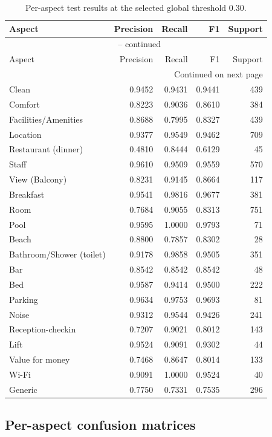 \documentclass[11pt,a4paper]{report}
\begin{document}
\begin{longtable}{p{4.3cm}rrrr}
\caption{Per-aspect test results at the selected global threshold 0.30.}\label{tab:aspect-results}\\
\toprule
Aspect & Precision & Recall & F1 & Support \\
\midrule
\endfirsthead
\multicolumn{5}{c}{\tablename\ \thetable{} -- continued}\\
\toprule
Aspect & Precision & Recall & F1 & Support \\
\midrule
\endhead
\midrule
\multicolumn{5}{r}{Continued on next page}\\
\endfoot
\bottomrule
\endlastfoot
Clean & 0.9452 & 0.9431 & 0.9441 & 439 \\
Comfort & 0.8223 & 0.9036 & 0.8610 & 384 \\
Facilities/Amenities & 0.8688 & 0.7995 & 0.8327 & 439 \\
Location & 0.9377 & 0.9549 & 0.9462 & 709 \\
Restaurant (dinner) & 0.4810 & 0.8444 & 0.6129 & 45 \\
Staff & 0.9610 & 0.9509 & 0.9559 & 570 \\
View (Balcony) & 0.8231 & 0.9145 & 0.8664 & 117 \\
Breakfast & 0.9541 & 0.9816 & 0.9677 & 381 \\
Room & 0.7684 & 0.9055 & 0.8313 & 751 \\
Pool & 0.9595 & 1.0000 & 0.9793 & 71 \\
Beach & 0.8800 & 0.7857 & 0.8302 & 28 \\
Bathroom/Shower (toilet) & 0.9178 & 0.9858 & 0.9505 & 351 \\
Bar & 0.8542 & 0.8542 & 0.8542 & 48 \\
Bed & 0.9587 & 0.9414 & 0.9500 & 222 \\
Parking & 0.9634 & 0.9753 & 0.9693 & 81 \\
Noise & 0.9312 & 0.9544 & 0.9426 & 241 \\
Reception-checkin & 0.7207 & 0.9021 & 0.8012 & 143 \\
Lift & 0.9524 & 0.9091 & 0.9302 & 44 \\
Value for money & 0.7468 & 0.8647 & 0.8014 & 133 \\
Wi-Fi & 0.9091 & 1.0000 & 0.9524 & 40 \\
Generic & 0.7750 & 0.7331 & 0.7535 & 296 \\
\end{longtable}

\subsection{Per-aspect confusion matrices}
\end{document}
